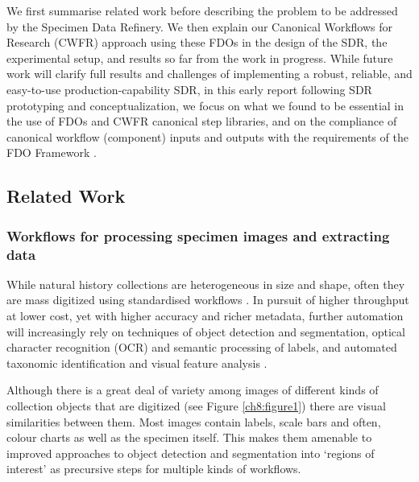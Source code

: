 We first summarise related work before describing the problem to be
addressed by the Specimen Data Refinery. We then explain our Canonical
Workflows for Research (CWFR) approach using these FDOs in the design of
the SDR, the experimental setup, and results so far from the work in
progress. While future work will clarify full results and challenges of
implementing a robust, reliable, and easy-to-use production-capability
SDR, in this early report following SDR prototyping and
conceptualization, we focus on what we found to be essential in the use
of FDOs and CWFR canonical step libraries, and on the compliance of
canonical workflow (component) inputs and outputs with the requirements
of the FDO Framework \cite{bonino2019}.

\subsection{Related Work}\label{related-work}

\subsubsection{Workflows for processing specimen images and extracting data}\label{workflows-for-processing-specimen-images-and-extracting-data}

While natural history collections are heterogeneous in size and shape,
often they are mass digitized using standardised workflows \cite{ch8-9,ch8-10,ch8-11,ch8-12,ch8-13}.
In pursuit of higher throughput at lower cost, yet with higher accuracy
and richer metadata, further automation will increasingly rely on
techniques of object detection and segmentation, optical character
recognition (OCR) and semantic processing of labels, and automated
taxonomic identification and visual feature analysis \cite{Walton 2020,ch8-18}.

Although there is a great deal of variety among images of different
kinds of collection objects that are digitized (see Figure \vref{ch8:figure1}) there are
visual similarities between them. Most images contain labels, scale bars
and often, colour charts as well as the specimen itself. This makes them
amenable to improved approaches to object detection \cite{ch8-32} and
segmentation into `regions of interest' \cite{ch8-33} as precursive steps for
multiple kinds of workflows.

